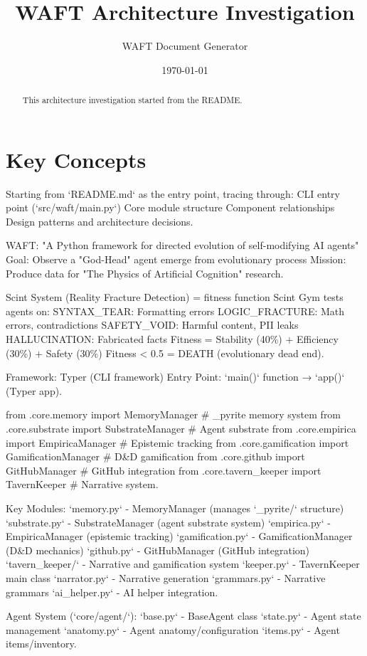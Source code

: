 \documentclass[11pt,letterpaper]{article}
\title{WAFT Architecture Investigation}
\author{WAFT Document Generator}
\date{\today}
\begin{document}
\maketitle

\begin{abstract}
This architecture investigation started from the README.
\end{abstract}

\section{Key Concepts}
Starting from `README.md` as the entry point, tracing through: CLI entry point (`src/waft/main.py`) Core module structure Component relationships Design patterns and architecture decisions.

WAFT: "A Python framework for directed evolution of self-modifying AI agents" Goal: Observe a "God-Head" agent emerge from evolutionary process Mission: Produce data for "The Physics of Artificial Cognition" research.

Scint System (Reality Fracture Detection) = fitness function Scint Gym tests agents on: SYNTAX\_TEAR: Formatting errors LOGIC\_FRACTURE: Math errors, contradictions SAFETY\_VOID: Harmful content, PII leaks HALLUCINATION: Fabricated facts Fitness = Stability (40\%) + Efficiency (30\%) + Safety (30\%) Fitness < 0.5 = DEATH (evolutionary dead end).

Framework: Typer (CLI framework) Entry Point: `main()` function → `app()` (Typer app).

from .core.memory import MemoryManager \# \_pyrite memory system from .core.substrate import SubstrateManager \# Agent substrate from .core.empirica import EmpiricaManager \# Epistemic tracking from .core.gamification import GamificationManager \# D\&D gamification from .core.github import GitHubManager \# GitHub integration from .core.tavern\_keeper import TavernKeeper \# Narrative system.

Key Modules: `memory.py` - MemoryManager (manages `\_pyrite/` structure) `substrate.py` - SubstrateManager (agent substrate system) `empirica.py` - EmpiricaManager (epistemic tracking) `gamification.py` - GamificationManager (D\&D mechanics) `github.py` - GitHubManager (GitHub integration) `tavern\_keeper/` - Narrative and gamification system `keeper.py` - TavernKeeper main class `narrator.py` - Narrative generation `grammars.py` - Narrative grammars `ai\_helper.py` - AI helper integration.

Agent System (`core/agent/`): `base.py` - BaseAgent class `state.py` - Agent state management `anatomy.py` - Agent anatomy/configuration `items.py` - Agent items/inventory.
\end{document}
